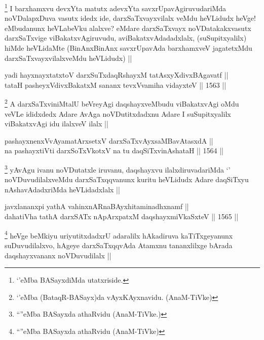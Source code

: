 \begin{artha}
\footnote{`\stext'eMba BASayxdiMda utatxriside.}
I barxhamxvu devxYta matutx adevxYta savxrUpavAgiruvudariMda noVDalapxDuva vasutx idedx ide, darxSaTxvayxvilalx veMdu heVLidudx heVge! eMbudanunx heVLabeVku alalxve? eMdare darxSaTxvayx noVDatakakxvasutx darxSaTxvige viBakatxvAgiruvudu, aviBakatxvAdadadxlalx, (suSupitxyalilx) hiMde heVLidaMte (BinAnxBinAnx savxrUpavAda barxhamxveV jagatetxMdu darxSaTxvayxvilalxveMdu heVLidudx) ||
\end{artha}

\begin{shl}
yadi hayxnayxtatxtoV darxSuTxdaqRshayxM tatAsxyXdivxBAgavatf ||  \\
tataH pasheyxVdivxBakatxM sananx tevxVvamiha vidayxteV ||  1563 ||  
\end{shl}

\begin{artha}
\footnote{`\stext'eMba (BataqR-BASayx)da vAyxKAyxnavidu. (AnaM-TiVke)}
A darxSaTxviniMtalU beVreyAgi daqshayxveMbudu viBakatxvAgi oMdu veVLe ididxdedx Adare AvAga noVDutitxdadxnu Adare I suSupitxyalilx viBakatxvAgi idu ilalxveV ilalx ||
\end{artha}


\begin{shl}
pashayxnenxVvAyamatArx\s \s setxV darxSaTxvAyxsaMBavAtasxdA || \\
na pashayxtiVti darxSoTxVkotxV na tu daqSiTxvinAshataH ||  1564 ||  
\end{shl}

\begin{artha}
\footnote{``\stext''eMba BASayxda athaRvidu (AnaM-TiVke.)}
yAvAgu ivanu noVDutatxle iruvanu, daqshayxvu ilalxdiruvadariMda `\stext' noVDuvudilalxveMdu darxSaTxqqvanunx kuritu heVLidudx Adare daqSiTxyu nAshavAdadxriMda heVLidadxlalx ||
\end{artha}

\begin{shl}
javxlananxpi yathA vahinxnARnaBAyxhitaminadhxnamf || \\
dahatiVha tathA darxSATx nApArxpatxM daqshayxmiVkaSxteV ||  1565 ||  
\end{shl}

\begin{artha}
\footnote{``\stext''eMba BASayxda athaRvidu (AnaM-TiVke)}
heVge beMkiyu uriyutitxdadxrU adaralilx hAkadiruva kaTiTxgeyanunx suDuvudilalxvo, hAgeye darxSaTxqqvAda Atamxnu tananxlilxge bArada daqshayxvananx noVDuvudilalx ||
\end{artha}

